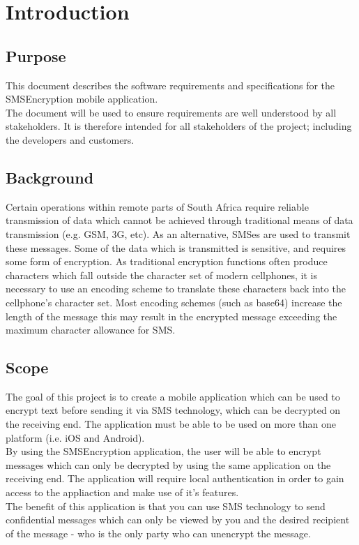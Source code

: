 \section{Introduction}

\subsection{Purpose}
This document describes the software requirements and specifications for the SMSEncryption mobile application.
\vspace{10pt}\\
The document will be used to ensure requirements are well understood by all stakeholders. It is therefore intended for all stakeholders of the project; including the developers and customers.

\subsection{Background}
Certain operations within remote parts of South Africa require reliable transmission of data which cannot be achieved through traditional means of data transmission (e.g. GSM, 3G, etc). As an alternative, SMSes are used to transmit these messages. Some of the data which is transmitted is sensitive, and requires some form of encryption. As traditional encryption functions often produce characters which fall outside the character set of modern cellphones, it is necessary to use an encoding scheme to translate these characters back into the cellphone's character set. Most encoding schemes (such as base64) increase the length of the message this may result in the encrypted message exceeding the maximum character allowance for SMS.
\subsection{Scope}
The goal of this project is to create a mobile application which can be used to encrypt text before sending it via SMS technology, which can be decrypted on the receiving end. The application must be able to be used on more than one platform (i.e. iOS and Android).
\vspace{10pt}\\
By using the SMSEncryption application, the user will be able to encrypt messages which can only be decrypted by using the same application on the receiving end. The application will require local authentication in order to gain access to the appliaction and make use of it's features.
\vspace{10pt}\\
The benefit of this application is that you can use SMS technology to send confidential messages which can only be viewed by you and the desired recipient of the message - who is the only party who can unencrypt the message.

